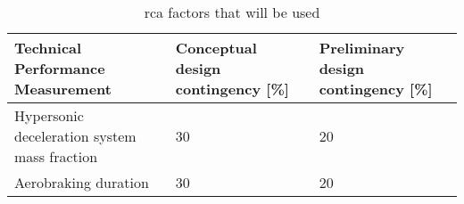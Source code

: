\begin{table}[h]
	\caption{\gls{rca} factors that will be used}
	\label{tab:tpm}
	\begin{tabular}{|p{}|p{}|p{}|}
		\hline
		\textbf{Technical Performance Measurement} & \textbf{Conceptual design contingency [\%]} & \textbf{Preliminary design contingency [\%]} \\ \hline
		Hypersonic deceleration system mass fraction & 30 & 20 \\ \hline
		Aerobraking duration & 30 & 20 \\ \hline
	\end{tabular}
\end{table}